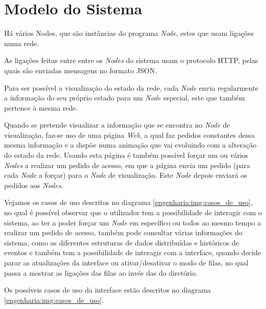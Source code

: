 \section{Modelo do Sistema}

Há vários Nodes, que são instâncias do programa \emph{Node}, estes que usam ligações numa rede.

As ligações feitas entre entre os \emph{Nodes} do sistema usam o protocolo \acs*{HTTP}, pelas quais são
enviadas mensagens no formato \acs*{JSON}.

Para ser possível a visualização do estado da rede, cada \emph{Node} envia regularmente a informação do
seu próprio estado para um \emph{Node} especial, este que também pertence à mesma rede.

Quando se pretende visualizar a informação que se encontra no \emph{Node} de visualização, faz-se uso de
uma página \emph{Web}, a qual faz pedidos constantes dessa mesma informação e a dispõe numa animação que 
vai evoluindo com a alteração do estado da rede.
Usando esta página é também possível forçar um ou vários \emph{Nodes}
a realizar um pedido de acesso, em que a página envia um pedido (para cada \emph{Node} a forçar) para o \emph{Node} de visualização.
Este \emph{Node} depois enviará os pedidos aos \emph{Nodes}. 

Vejamos os casos de uso descritos no diagrama \ref{engenharia:img:casos_de_uso}, 
no qual é possível observar que o utilizador tem a possibilidade de interagir com o sistema, ao ter a poder forçar
um \emph{Node} em específico ou todos ao mesmo tempo a realizar um pedido de acesso, também pode consultar várias informações do sistema,
como as diferentes estruturas de dados distribuídas e históricos de eventos e também tem a possibilidade de interagir com a interface, 
quando decide parar as atualizações da interface ou ativar/desativar o modo de filas, no qual passa a mostrar as ligações das filas ao invés
das do diretório.


Os possíveis casos de uso da interface estão descritos no diagrama \ref{engenharia:img:casos_de_uso}.


